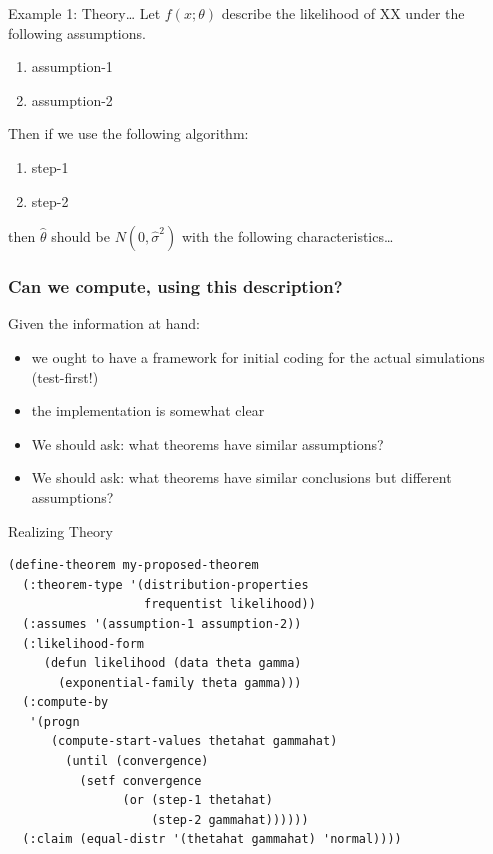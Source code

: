 \documentclass{beamer}
\begin{document}
\begin{frame}[fragile]{Example 1: Theory\ldots}
  \label{example1}
  Let $f(x;\theta)$ describe the likelihood of XX under the following
  assumptions.  
  \begin{enumerate}
  \item assumption-1
  \item assumption-2
  \end{enumerate}
  Then if we use the following algorithm:
  \begin{enumerate}
  \item step-1
  \item step-2
  \end{enumerate}
  then $\hat{\theta}$ should be $N(0,\hat\sigma^2)$ with the following
  characteristics\ldots
\end{frame}

\begin{frame}
  \frametitle{Can we compute, using this description?}
  Given the information at hand:
  \begin{itemize}
  \item we ought to have a framework for initial coding for the
    actual simulations (test-first!)
  \item the implementation is somewhat clear
  \item We should ask: what theorems have similar assumptions?
  \item We should ask: what theorems have similar conclusions but
    different assumptions?
  \end{itemize}
\end{frame}
\begin{frame}[fragile]{Realizing Theory}
\small{
\begin{verbatim}  
(define-theorem my-proposed-theorem
  (:theorem-type '(distribution-properties
                   frequentist likelihood))
  (:assumes '(assumption-1 assumption-2))
  (:likelihood-form
     (defun likelihood (data theta gamma)
       (exponential-family theta gamma)))
  (:compute-by
   '(progn
      (compute-start-values thetahat gammahat)
        (until (convergence)
          (setf convergence
                (or (step-1 thetahat)
                    (step-2 gammahat))))))
  (:claim (equal-distr '(thetahat gammahat) 'normal))))
\end{verbatim}
}
\end{frame}
\end{document}
